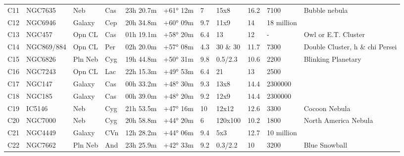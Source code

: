 \begin{table}[h]
\begin{tabular}{@{}lllllllllll@{}}
C11        & NGC7635     & Neb        & Cas       & 23h 20.7m & +61° 12m  & 7         & 15x8                 & 16.2     & 7100                & Bubble nebula                   \\
C12        & NGC6946     & Galaxy     & Cep       & 20h 34.8m & +60° 09m  & 9.7       & 11x9                 & 14       & 18 million          &                                 \\
C13        & NGC457      & Opn CL     & Cas       & 01h 19.1m & +58° 20m  & 6.4       & 13                   & 12       & -                   & Owl or E.T. Cluster             \\
C14        & NGC869/884  & Opn CL     & Per       & 02h 20.0m & +57° 08m  & 4.3       & 30 \& 30             & 11.7     & 7300                & Double Cluster, h \& chi Persei \\
C15        & NGC6826     & Pln Neb    & Cyg       & 19h 44.8m & +50° 31m  & 9.8       & 0.5/2.3              & 10.6     & 2200                & Blinking Planetary              \\
C16        & NGC7243     & Opn CL     & Lac       & 22h 15.3m & +49° 53m  & 6.4       & 21                   & 13       & 2500                &                                 \\
C17        & NGC147      & Galaxy     & Cas       & 00h 33.2m & +48° 30m  & 9.3       & 13x8                 & 14.4     & 2300000             &                                 \\
C18        & NGC185      & Galaxy     & Cas       & 00h 39.0m & +48° 20m  & 9.2       & 12x9                 & 14.4     & 2300000             &                                 \\
C19        & IC5146      & Neb        & Cyg       & 21h 53.5m & +47° 16m  & 10        & 12x12                & 12.6     & 3300                & Cocoon Nebula                   \\
C20        & NGC7000     & Neb        & Cyg       & 20h 58.8m & +44° 20m  & 6         & 120x100              & 10.2     & 1800                & North America Nebula            \\
C21        & NGC4449     & Galaxy     & CVn       & 12h 28.2m & +44° 06m  & 9.4       & 5x3                  & 12.7     & 10 million          &                                 \\
C22        & NGC7662     & Pln Neb    & And       & 23h 25.9m & +42° 33m  & 9.2       & 0.3/2.2              & 10       & 3200                & Blue Snowball                   \\

\end{tabular}
\end{table}
